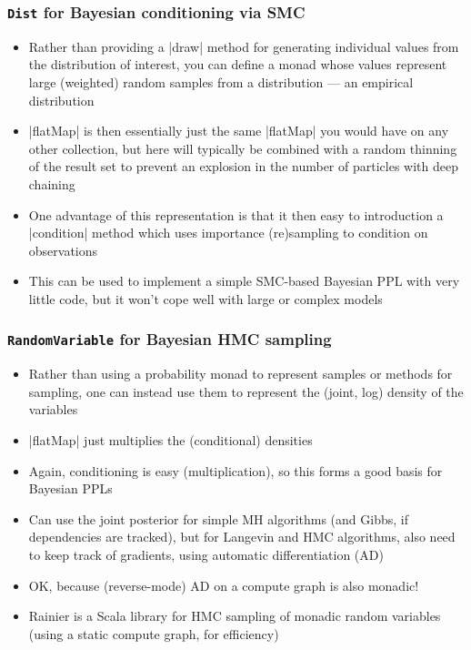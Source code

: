 \documentclass[mathserif,handout]{beamer}
\begin{document}
\begin{frame}[fragile]
  \frametitle{\texttt{Dist} for Bayesian conditioning via SMC}
  \begin{itemize}
  \item Rather than providing a |draw| method for generating individual values from the distribution of interest, you can define a monad whose values represent large (weighted) random samples from a distribution --- an empirical distribution
  \item |flatMap| is then essentially just the same |flatMap| you would have on any other collection, but here will typically be combined with a random thinning of the result set to prevent an explosion in the number of particles with deep chaining
  \item One advantage of this representation is that it then easy to introduction a |condition| method which uses importance (re)sampling to condition on observations
    \item This can be used to implement a simple SMC-based Bayesian PPL with very little code, but it won't cope well with large or complex models
    \end{itemize}
\end{frame}

\begin{frame}[fragile]
  \frametitle{\texttt{RandomVariable} for Bayesian HMC sampling}
  \begin{itemize}
  \item Rather than using a probability monad to represent samples or methods for sampling, one can instead use them to represent the (joint, log) density of the variables
    \item |flatMap| just multiplies the (conditional) densities
    \item Again, conditioning is easy (multiplication), so this forms a good basis for Bayesian PPLs
    \item Can use the joint posterior for simple MH algorithms (and Gibbs, if dependencies are tracked), but for Langevin and HMC algorithms, also need to keep track of gradients, using automatic differentiation (AD)
      \item OK, because (reverse-mode) AD on a compute graph is also monadic!
    \item \alert{Rainier} is a Scala library for HMC sampling of monadic random variables (using a static compute graph, for efficiency)
    \end{itemize}
\end{frame}
\end{document}

